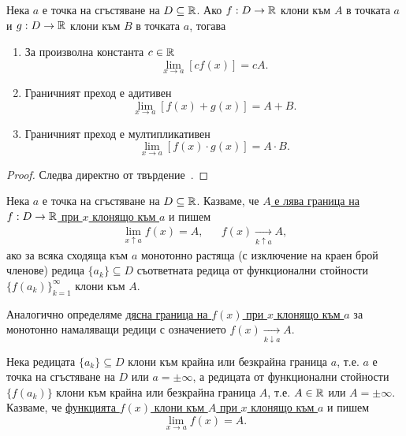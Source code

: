 \documentclass[numbers=endperiod, DIV=15, bibliography=totocnumbered]{scrartcl}
\begin{document}
\begin{proposition}\label{thm:limit-linear-mult}
  Нека $a$ е точка на сгъстяване на $D \subseteq \mathbb{R}$. Ако $f: D \to \mathbb{R}$ клони към $A$ в точката $a$ и $g: D \to \mathbb{R}$ клони към $B$ в точката $a$, тогава
  \begin{enumerate}
    \item За произволна константа $c \in \mathbb{R}$
    \begin{displaymath}
      \lim_{x \to a} [c f(x)] = c A.
    \end{displaymath}

    \item Граничният преход е адитивен
    \begin{displaymath}
      \lim_{x \to a} [f(x) + g(x)] = A + B.
    \end{displaymath}

    \item Граничният преход е мултипликативен
    \begin{displaymath}
      \lim_{x \to a} [f(x) \cdot g(x)] = A \cdot B.
    \end{displaymath}
  \end{enumerate}
\end{proposition}
\begin{proof}
  Следва директно от твърдение~\label{thm:sum-prod-limit}.
\end{proof}

\begin{definition}
  Нека $a$ е точка на сгъстяване на $D \subseteq \mathbb{R}$. Казваме, че \uline{$A$ е лява граница на $f: D \to \mathbb{R}$ при $x$ клонящо към $a$} и пишем
  \begin{align*}
    \lim_{x \uparrow a} f(x) = A,
    &&
    f(x) \underset {k \uparrow a} \longrightarrow A,
  \end{align*}
  ако за всяка сходяща към $a$ монотонно растяща (с изключение на краен брой членове) редица $\{ a_k \} \subseteq D$ съответната редица от функционални стойности ${\{ f(a_k) \}}_{k=1}^\infty$ клони към $A$.

  Аналогично определяме \uline{дясна граница на $f(x)$ при $x$ клонящо към $a$} за монотонно намаляващи редици с означението $f(x) \underset {k \downarrow a} \longrightarrow A$.
\end{definition}

\begin{definition}
  Нека редицата $\{ a_k \} \subseteq D$ клони към крайна или безкрайна граница $a$, т.е. $a$ е точка на сгъстяване на $D$ или $a = \pm \infty$, а редицата от функционални стойности $\{ f(a_k) \}$ клони към крайна или безкрайна граница $A$, т.е. $A \in \mathbb{R}$ или $A = \pm \infty$. Казваме, че \uline{функцията $f(x)$ клони към $A$ при $x$ клонящо към $a$} и пишем
  \begin{displaymath}
    \lim_{x \to a} f(x) = A.
  \end{displaymath}
\end{definition}
\end{document}
